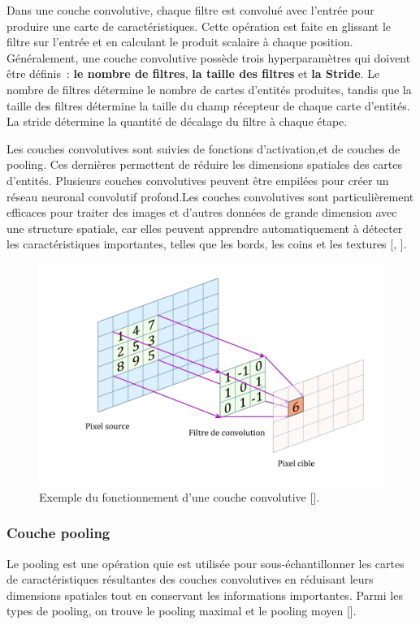 \medskip
Dans une couche convolutive, chaque filtre est convolué avec l'entrée pour produire une carte de caractéristiques. Cette opération est faite en glissant le filtre sur l'entrée et en calculant le produit scalaire à chaque position. Généralement, une couche convolutive possède trois hyperparamètres qui doivent être définis : \textbf{le nombre de filtres}, \textbf{la taille des filtres} et \textbf{la Stride}. Le nombre de filtres détermine le nombre de cartes d'entités produites, tandis que la taille des filtres détermine la taille du champ récepteur de chaque carte d'entités. La stride détermine la quantité de décalage du filtre à chaque étape.

\medskip
Les couches convolutives sont suivies de fonctions d'activation,et de couches de pooling. Ces dernières permettent de réduire les dimensions spatiales des cartes d'entités. Plusieurs couches convolutives peuvent être empilées pour créer un réseau neuronal convolutif profond.Les couches convolutives sont particulièrement efficaces pour traiter des images et d'autres données de grande dimension avec une structure spatiale, car elles peuvent apprendre automatiquement à détecter les caractéristiques importantes, telles que les bords, les coins et les textures [\cite{kimura_yoshinaga_sekijima_azechi_baba_2019}, \cite{Goodfellow-et-al-2016}].

\begin{figure}[hbt!]
	\centering
	\includegraphics[width=12
		cm]{images_pfe/layerconv.png}
	\caption{Exemple du fonctionnement d'une couche convolutive [\cite{kimura_yoshinaga_sekijima_azechi_baba_2019}].}
	\label{fig:conv}
\end{figure}
\FloatBarrier
\medskip

\subsubsection{Couche pooling}
Le pooling est une opération quie est utilisée pour sous-échantillonner les
cartes de caractéristiques résultantes des couches convolutives en réduisant
leurs dimensions spatiales tout en conservant les informations importantes.
Parmi les types de pooling, on trouve le pooling maximal et le pooling moyen
	[\cite{Goodfellow-et-al-2016}].

